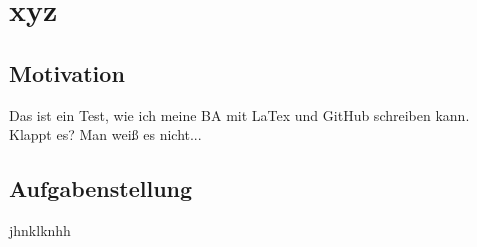 \chapter{xyz}

\section{Motivation}
\label{sec:Sektion 1}
Das ist ein Test, wie ich meine BA mit LaTex und GitHub schreiben kann.
Klappt es?
Man weiß es nicht...
\section{Aufgabenstellung}
\label{sec:Sektion 2}
jhnklknhh

